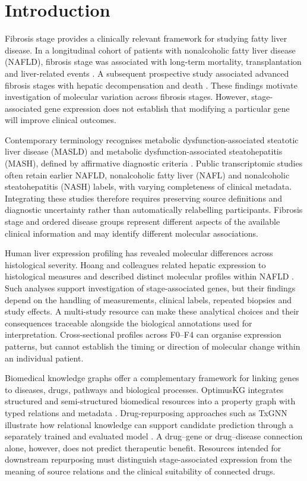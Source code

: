 \documentclass[11pt,a4paper]{article}
\begin{document}
\section*{Introduction}
Fibrosis stage provides a clinically relevant framework for studying fatty liver disease. In a longitudinal cohort of patients with nonalcoholic fatty liver disease (NAFLD), fibrosis stage was associated with long-term mortality, transplantation and liver-related events \cite{ref1}. A subsequent prospective study associated advanced fibrosis stages with hepatic decompensation and death \cite{ref2}. These findings motivate investigation of molecular variation across fibrosis stages. However, stage-associated gene expression does not establish that modifying a particular gene will improve clinical outcomes.

Contemporary terminology recognises metabolic dysfunction-associated steatotic liver disease (MASLD) and metabolic dysfunction-associated steatohepatitis (MASH), defined by affirmative diagnostic criteria \cite{ref3}. Public transcriptomic studies often retain earlier NAFLD, nonalcoholic fatty liver (NAFL) and nonalcoholic steatohepatitis (NASH) labels, with varying completeness of clinical metadata. Integrating these studies therefore requires preserving source definitions and diagnostic uncertainty rather than automatically relabelling participants. Fibrosis stage and ordered disease groups represent different aspects of the available clinical information and may identify different molecular associations.

Human liver expression profiling has revealed molecular differences across histological severity. Hoang and colleagues related hepatic expression to histological measures and described distinct molecular profiles within NAFLD \cite{ref4}. Such analyses support investigation of stage-associated genes, but their findings depend on the handling of measurements, clinical labels, repeated biopsies and study effects. A multi-study resource can make these analytical choices and their consequences traceable alongside the biological annotations used for interpretation. Cross-sectional profiles across F0–F4 can organise expression patterns, but cannot establish the timing or direction of molecular change within an individual patient.

Biomedical knowledge graphs offer a complementary framework for linking genes to diseases, drugs, pathways and biological processes. OptimusKG integrates structured and semi-structured biomedical resources into a property graph with typed relations and metadata \cite{ref5}. Drug-repurposing approaches such as TxGNN illustrate how relational knowledge can support candidate prediction through a separately trained and evaluated model \cite{ref6}. A drug–gene or drug–disease connection alone, however, does not predict therapeutic benefit. Resources intended for downstream repurposing must distinguish stage-associated expression from the meaning of source relations and the clinical suitability of connected drugs.
\end{document}
